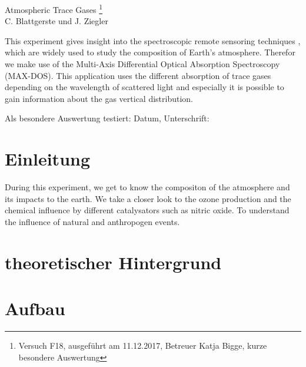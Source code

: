 \documentclass[12pt]{article}
\begin{document}
\thispagestyle{empty}
\null\vspace{40mm}
\begin{center}
{
\Large  Atmospheric Trace Gases
\footnote{\noindent Versuch F18, ausgeführt am 11.12.2017, Betreuer Katja Bigge, kurze besondere Auswertung}
}\\[15mm]

C. Blattgerste und J. Ziegler

\vspace{25mm}

\parbox{0.9\textwidth}{

\small  This experiment gives insight into the spectroscopic remote sensoring techniques
, which are widely used to study the composition of Earth's atmosphere.
Therefor we make use of the Multi-Axis Differential Optical Absorption Spectroscopy (MAX-DOS).
This application uses the different absorption of trace gases depending on the
wavelength of scattered light and especially it is possible to gain information about
the gas vertical distribution.
}
\end{center}

\vfill
Als besondere Auswertung testiert: Datum, Unterschrift:
\vspace{20mm}

\newpage
\null\thispagestyle{empty}

\newpage     %
\tableofcontents
{}
\newpage


\section{Einleitung}
  \begin{multicols}{2}
    During this experiment, we get to know the compositon of the atmosphere and
    its impacts to the earth.
    We take a closer look to the ozone production and the chemical influence by
    different catalysators such as nitric oxide. To understand the influence of natural and
    anthropogen events.
  \end{multicols}

\section{theoretischer Hintergrund}

\section{Aufbau}
\end{document}

